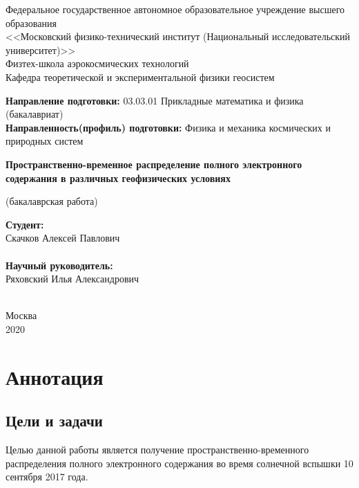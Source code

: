 \documentclass[a4paper]{article}
\begin{document}
\begin{center}
\small
Федеральное государственное автономное образовательное учреждение высшего образования\\
<<Московский физико-технический институт (Национальный исследовательский университет)>> \\
Физтех-школа аэрокосмических технологий\\
Кафедра теоретической и экспериментальной физики геосистем
\end{center}

\begin{flushleft}
\small
\textbf{Направление подготовки:} 03.03.01 Прикладные математика и физика (бакалавриат)\\
\textbf{Направленность(профиль) подготовки:} Физика и механика космических и природных систем\\
\end{flushleft}

\begin{center}
\LARGE
\textbf{Пространственно-временное распределение полного электронного содержания в различных геофизических условиях}

\small(бакалаврская работа)
\end{center}


\begin{flushright}

\noindent
\textbf{Студент:} \\
Скачков Алексей Павлович\\
\underline{\hspace{3cm}}\\
\textbf{Научный руководитель:}\\
Ряховский Илья Александрович\\
\underline{\hspace{3cm}}\\

\end{flushright}

\begin{center}
\small
Москва\\
2020
\end{center}


\newpage
\section*{Аннотация}

\subsection*{Цели и задачи}
Целью данной работы является получение пространственно-временного распределения полного электронного содержания во время солнечной вспышки 10 сентября 2017 года.\\
\end{document}
